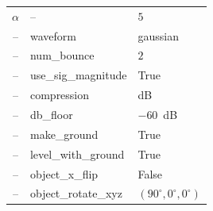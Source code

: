 \documentclass[sensors,article,submit,moreauthors]{Definitions/mdpi}
\begin{document}
\begin{table}[H]
\begin{tabular}{lll}
$\alpha$                  & --                     & $5$ \\
\multicolumn{1}{c}{--}     & waveform                 & gaussian \\
\multicolumn{1}{c}{--}     & num\_bounce              & $2$ \\
\multicolumn{1}{c}{--}     & use\_sig\_magnitude      & True \\
\multicolumn{1}{c}{--}     & compression              & dB \\
\multicolumn{1}{c}{--}     & db\_floor                & $-60$~dB \\
\multicolumn{1}{c}{--}     & make\_ground             & True \\
\multicolumn{1}{c}{--}     & level\_with\_ground      & True \\
\multicolumn{1}{c}{--}     & object\_x\_flip          & False \\
\multicolumn{1}{c}{--}     & object\_rotate\_xyz      & $(90^\circ, 0^\circ,
0^\circ)$ \\
\bottomrule
\end{tabular}
\end{table}
\end{document}

